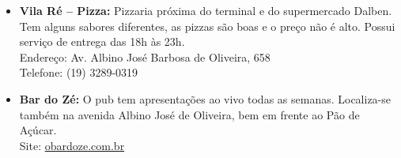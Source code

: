 \begin{itemize}
\item   \textbf{Vila Ré -- Pizza:} Pizzaria próxima do terminal e do
        supermercado Dalben. Tem alguns sabores diferentes, as pizzas são boas e
        o preço não é alto. Possui serviço de entrega das 18h às 23h.
        \\Endereço: Av. Albino José Barbosa de Oliveira, 658
        \\Telefone: (19) 3289-0319

\item   \textbf{Bar do Zé:} O pub tem apresentações ao vivo todas as semanas.
        Localiza-se também na avenida Albino José de Oliveira, bem em frente ao
        Pão de Açúcar.
        \\Site: \url{obardoze.com.br}
\end{itemize}
